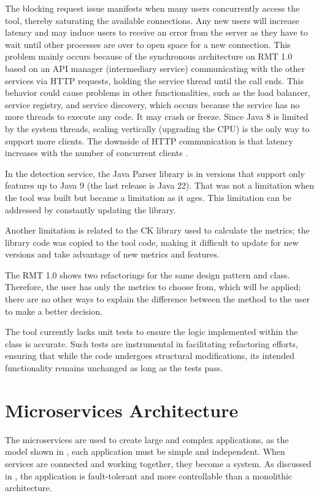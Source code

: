 The blocking request issue manifests when many users concurrently access the tool, thereby saturating the available connections. Any new users will increase latency and may induce users to receive an error from the server as they have to wait until other processes are over to open space for a new connection. This problem mainly occurs because of the synchronous architecture on RMT 1.0 based on an API manager (intermediary service) communicating with the other services via HTTP requests, holding the service thread until the call ends. This behavior could cause problems in other functionalities, such as the load balancer, service registry, and service discovery, which occurs because the service has no more threads to execute any code. It may crash or freeze. Since Java 8 is limited by the system threads, scaling vertically (upgrading the CPU) is the only way to support more clients. The downside of HTTP communication is that latency increases with the number of concurrent clients \cite{Cebeci2020DesignOA}. 

In the detection service, the Java Parser library \textcite{javaparser} is in versions that support only features up to Java 9 (the last release is Java 22). That was not a limitation when the tool was built but became a limitation as it ages. This limitation can be addressed by constantly updating the library.

Another limitation is related to the CK \textcite{ck} library used to calculate the metrics; the library code was copied to the tool code, making it difficult to update for new versions and take advantage of new metrics and features. 

The RMT 1.0 shows two refactorings for the same design pattern and class. Therefore, the user has only the metrics to choose from, which will be applied; there are no other ways to explain the difference between the method to the user to make a better decision.

The tool currently lacks unit tests to ensure the logic implemented within the class is accurate. Such tests are instrumental in facilitating refactoring efforts, ensuring that while the code undergoes structural modifications, its intended functionality remains unchanged as long as the tests pass.

\section{Microservices Architecture}
\label{sec-microservices}
The microservices are used to create large and complex applications, as the model shown in , each application must be simple and independent. When services are connected and working together, they become a system. As discussed in \textcite{microservices-comuni}, the application is fault-tolerant and more controllable than a monolithic architecture.

